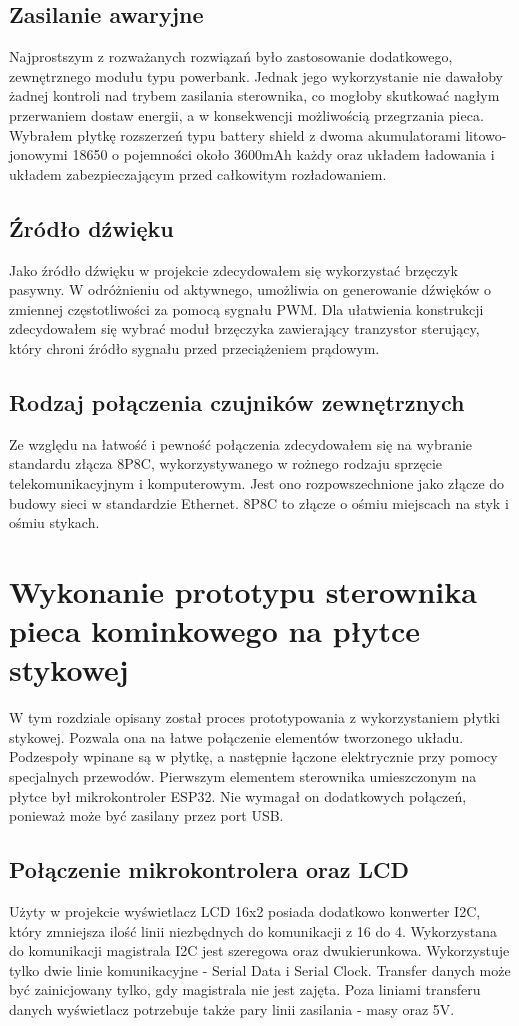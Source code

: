 \documentclass[11pt]{report}
\begin{document}
 \section{Zasilanie awaryjne}
 Najprostszym z rozważanych rozwiązań było zastosowanie dodatkowego, zewnętrznego modułu typu powerbank. Jednak jego wykorzystanie nie dawałoby żadnej kontroli nad trybem zasilania sterownika, co mogłoby skutkować nagłym przerwaniem dostaw energii, a w konsekwencji możliwością przegrzania pieca. Wybrałem płytkę rozszerzeń typu battery shield z dwoma akumulatorami litowo-jonowymi 18650 o pojemności około 3600mAh każdy oraz układem ładowania i układem zabezpieczającym przed całkowitym rozładowaniem.
 
 \section{Źródło dźwięku}
 Jako źródło dźwięku w projekcie zdecydowałem się wykorzystać brzęczyk pasywny. W odróżnieniu od aktywnego, umożliwia on generowanie dźwięków o zmiennej częstotliwości za pomocą sygnału PWM. Dla ułatwienia konstrukcji zdecydowałem się wybrać moduł brzęczyka zawierający tranzystor sterujący, który chroni źródło sygnału przed przeciążeniem prądowym.
 
 \section{Rodzaj połączenia czujników zewnętrznych}
 Ze względu na łatwość i pewność połączenia zdecydowałem się na wybranie standardu złącza 8P8C, wykorzystywanego w rożnego rodzaju sprzęcie telekomunikacyjnym i komputerowym. Jest ono rozpowszechnione jako złącze do budowy sieci w standardzie Ethernet. 8P8C to złącze o ośmiu miejscach na styk i ośmiu stykach.
 
 
 \chapter{Wykonanie prototypu sterownika pieca kominkowego na płytce stykowej}
 W tym rozdziale opisany został proces prototypowania z wykorzystaniem płytki stykowej.
 Pozwala ona na łatwe połączenie elementów tworzonego układu. Podzespoły wpinane są w płytkę, a następnie łączone elektrycznie przy pomocy specjalnych przewodów.
 Pierwszym elementem sterownika umieszczonym na płytce był mikrokontroler ESP32. Nie wymagał on dodatkowych połączeń, ponieważ może być zasilany przez port USB.
  
 \section{Połączenie mikrokontrolera oraz LCD}
 Użyty w projekcie wyświetlacz LCD 16x2 posiada dodatkowo konwerter I2C, który zmniejsza ilość linii niezbędnych do komunikacji z 16 do 4. Wykorzystana do komunikacji magistrala I2C jest szeregowa oraz dwukierunkowa. Wykorzystuje tylko dwie linie komunikacyjne - Serial Data i Serial Clock. Transfer danych może być zainicjowany tylko, gdy magistrala nie jest zajęta. Poza liniami transferu danych wyświetlacz potrzebuje także pary linii zasilania - masy oraz 5V.
  
\end{document}
